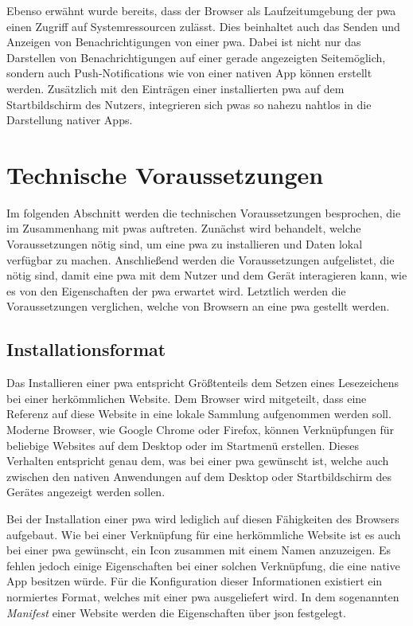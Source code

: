 \documentclass[12pt, parskip=half]{scrartcl}       %
\begin{document}
Ebenso erwähnt wurde bereits, dass der Browser als Laufzeitumgebung der \ac{pwa} einen Zugriff auf Systemressourcen zulässt.
Dies beinhaltet auch das Senden und Anzeigen von Benachrichtigungen von einer \ac{pwa}.
Dabei ist nicht nur das Darstellen von Benachrichtigungen auf einer gerade angezeigten Seitemöglich, sondern auch Push-Notifications wie von einer nativen App können erstellt werden.
Zusätzlich mit den Einträgen einer installierten \ac{pwa} auf dem Startbildschirm des Nutzers, integrieren sich \acp{pwa} so nahezu nahtlos in die Darstellung nativer Apps.


\section{Technische Voraussetzungen}
\label{sec:voraussetzung}

Im folgenden Abschnitt werden die technischen Voraussetzungen besprochen, die im Zusammenhang mit \acp{pwa} auftreten.
Zunächst wird behandelt, welche Voraussetzungen nötig sind, um eine \ac{pwa} zu installieren und Daten lokal verfügbar zu machen.
Anschließend werden die Voraussetzungen aufgelistet, die nötig sind, damit eine \ac{pwa} mit dem Nutzer und dem Gerät interagieren kann, wie es von den Eigenschaften der \ac{pwa} erwartet wird.
Letztlich werden die Voraussetzungen verglichen, welche von Browsern an eine \ac{pwa} gestellt werden.

\subsection{Installationsformat}

Das Installieren einer \ac{pwa} entspricht Größtenteils dem Setzen eines Lesezeichens bei einer herkömmlichen Website.
Dem Browser wird mitgeteilt, dass eine Referenz auf diese Website in eine lokale Sammlung aufgenommen werden soll.
Moderne Browser, wie Google Chrome oder Firefox, können Verknüpfungen für beliebige Websites auf dem Desktop oder im Startmenü erstellen\cite{mozillasupport_desktopshortcut}\cite{businessinsider_desktopshortcut_chrome}.
Dieses Verhalten entspricht genau dem, was bei einer \ac{pwa} gewünscht ist, welche auch zwischen den nativen Anwendungen auf dem Desktop oder Startbildschirm des Gerätes angezeigt werden sollen.

Bei der Installation einer \ac{pwa} wird lediglich auf diesen Fähigkeiten des Browsers aufgebaut.
Wie bei einer Verknüpfung für eine herkömmliche Website ist es auch bei einer \ac{pwa} gewünscht, ein Icon zusammen mit einem Namen anzuzeigen.
Es fehlen jedoch einige Eigenschaften bei einer solchen Verknüpfung, die eine native App besitzen würde.
Für die Konfiguration dieser Informationen existiert ein normiertes Format, welches mit einer \ac{pwa} ausgeliefert wird.
In dem sogenannten \textit{Manifest} einer Website werden die Eigenschaften über \ac{json} festgelegt.
\end{document}
